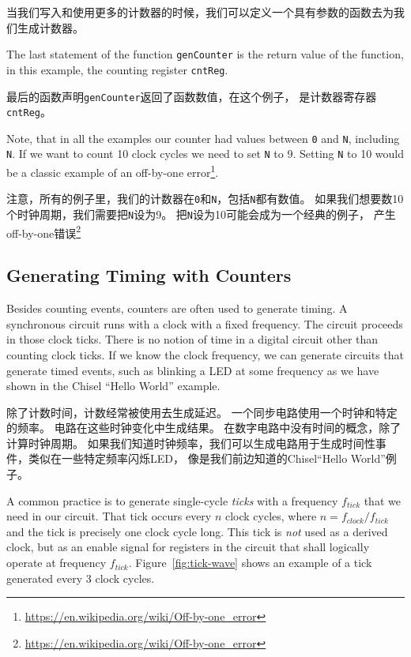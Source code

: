 \documentclass[%
    10pt,
    headinclude, footexclude,
    openright, %
    notitlepage,
    cleardoubleempty,
    headsepline,
    pointlessnumbers,
    bibtotoc, idxtotoc,
    ]{scrbook}
\newcommand{\code}[1]{{\small{\texttt{#1}}}}
\newcommand{\myref}[2]{\href{#1}{#2}}
\renewcommand{\myref}[2]{{#2}{\footnote{\url{#1}}}}
\begin{document}
\noindent 当我们写入和使用更多的计数器的时候，我们可以定义一个具有参数的函数去为我们生成计数器。


\noindent The last statement of the function \code{genCounter} is the return
value of the function, in this example, the counting register \code{cntReg}.

\noindent 最后的函数声明\code{genCounter}返回了函数数值，在这个例子，
是计数器寄存器\code{cntReg}。

Note, that in all the examples our counter had values between \code{0} and
\code{N}, including \code{N}. If we want to count 10 clock cycles we need
to set \code{N} to 9. Setting \code{N} to 10 would be a classic example of an
\myref{https://en.wikipedia.org/wiki/Off-by-one_error}{off-by-one error}.

注意，所有的例子里，我们的计数器在\code{0}和\code{N}，包括\code{N}都有数值。
如果我们想要数10个时钟周期，我们需要把\code{N}设为9。
把\code{N}设为10可能会成为一个经典的例子，
产生\myref{https://en.wikipedia.org/wiki/Off-by-one_error}{off-by-one错误}

\subsection{Generating Timing with Counters}

Besides counting events, counters are often used to generate timing.
A synchronous circuit runs with a clock with a fixed frequency.
The circuit proceeds in those clock ticks. There is no notion of time in a digital
circuit other than counting clock ticks. If we know the clock frequency, we
can generate circuits that generate timed events, such as blinking a LED
at some frequency as we have shown in the Chisel ``Hello World'' example.

除了计数时间，计数经常被使用去生成延迟。
一个同步电路使用一个时钟和特定的频率。
电路在这些时钟变化中生成结果。
在数字电路中没有时间的概念，除了计算时钟周期。
如果我们知道时钟频率，我们可以生成电路用于生成时间性事件，类似在一些特定频率闪烁LED，
像是我们前边知道的Chisel``Hello World''例子。

A common practice is to generate single-cycle \emph{ticks} with a frequency $f_{tick}$
that we need in our circuit. That tick occurs every $n$ clock cycles,
where $n = f_{clock}/f_{tick}$ and the tick is precisely one clock cycle long.
This tick is \emph{not} used as a derived clock, but as an enable signal for
registers in the circuit that shall logically operate at frequency $f_{tick}$.
Figure~\ref{fig:tick-wave} shows an example of a tick generated every
3 clock cycles.
\end{document}
